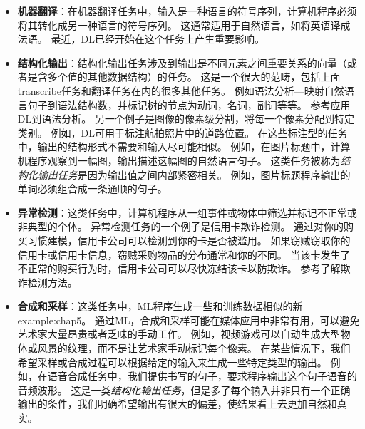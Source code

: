 \begin{itemize}
    \item \textbf{机器翻译}：在机器翻译任务中，输入是一种语言的符号序列，计算机程序必须将其转化成另一种语言的符号序列。
    这通常适用于自然语言，如将英语译成法语。
    最近，\gls{DL}已经开始在这个任务上产生重要影响\citep{Sutskever-et-al-NIPS2014,Bahdanau-et-al-ICLR2015-small}。

    \item \textbf{结构化输出}：结构化输出任务涉及到输出是不同元素之间重要关系的向量（或者是含多个值的其他数据结构）的任务。
    这是一个很大的范畴，包括上面\gls{transcribe}任务和翻译任务在内的很多其他任务。
    例如语法分析---映射自然语言句子到语法结构数，并标记树的节点为动词，名词，副词等等。
    参考\cite{Collobert-AISTATS2011}应用\gls{DL}到语法分析。
    另一个例子是图像的像素级分割，将每一个像素分配到特定类别。
    例如，\gls{DL}可用于标注航拍照片中的道路位置\citep{MnihHinton2010}。
    在这些标注型的任务中，输出的结构形式不需要和输入尽可能相似。
    例如，在图片标题中，计算机程序观察到一幅图，输出描述这幅图的自然语言句子\citep{Kiros-et-al-ICML2014,Kiros-et-al-arxiv2014,Mao-et-al-2014,Vinyals-et-al-CVPR2015,Donahue-et-al-arxiv2014,Karpathy+Li-CVPR2015,Fang-et-al-CVPR2015,Xu-et-al-ICML2015}。
    这类任务被称为\emph{结构化输出任务}是因为输出值之间内部紧密相关。
    例如，图片标题程序输出的单词必须组合成一条通顺的句子。


    \item \textbf{异常检测}：这类任务中，计算机程序从一组事件或物体中筛选并标记不正常或非典型的个体。
    异常检测任务的一个例子是信用卡欺诈检测。
    通过对你的购买习惯建模，信用卡公司可以检测到你的卡是否被滥用。
    如果窃贼窃取你的信用卡或信用卡信息，窃贼采购物品的分布通常和你的不同。
    当该卡发生了不正常的购买行为时，信用卡公司可以尽快冻结该卡以防欺诈。
    参考\cite{chandola2009anomaly}了解欺诈检测方法。

    \item \textbf{合成和采样}：这类任务中，\gls{ML}程序生成一些和训练数据相似的新\gls{example:chap5}。
    通过\gls{ML}，合成和采样可能在媒体应用中非常有用，可以避免艺术家大量昂贵或者乏味的手动工作。
    例如，视频游戏可以自动生成大型物体或风景的纹理，而不是让艺术家手动标记每个像素\citep{Luo+al-AISTATS2013-small}。
    在某些情况下，我们希望采样或合成过程可以根据给定的输入来生成一些特定类型的输出。
    例如，在语音合成任务中，我们提供书写的句子，要求程序输出这个句子语音的音频波形。
    这是一类\emph{结构化输出任务}，但是多了每个输入并非只有一个正确输出的条件，我们明确希望输出有很大的偏差，使结果看上去更加自然和真实。


\end{itemize}
